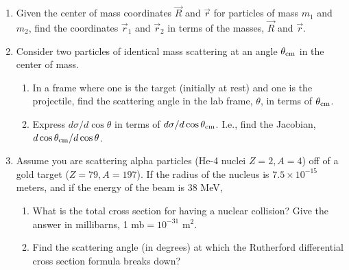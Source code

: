\begin{enumerate}
\item Given the center of mass coordinates $\vec{R}$ and $\vec{r}$ for particles of mass $m_1$ and $m_2$, find the coordinates $\vec{r}_1$ and $\vec{r}_2$ in terms of the masses, $\vec{R}$ and $\vec{r}$.

\item Consider two particles of identical mass scattering at an angle $\theta_{\rm cm}$ in the center of mass.
\begin{enumerate}
\item In a frame where one is the target (initially at rest) and one is the projectile, find the scattering angle in the lab frame, $\theta$, in terms of $\theta_{\rm cm}$.
\item Express $d\sigma/d\cos\theta$ in terms of $d\sigma/d\cos\theta_{\rm cm}$. I.e., find the Jacobian, $d\cos\theta_{\rm cm}/d\cos\theta$.
\end{enumerate}

\item Assume you are scattering alpha particles (He-4 nuclei $Z=2, A=4$) off of a gold target ($Z=79, A=197$). If the radius of the nucleus is $7.5\times 10^{-15}$ meters, and if the energy of the beam is 38 MeV,
\begin{enumerate}
\item What is the total cross section for having a nuclear collision? Give the answer in millibarns, 1 mb$=10^{-31}$ m$^2$.
\item Find the scattering angle (in degrees) at which the Rutherford differential cross section formula breaks down?

\end{enumerate}
\end{enumerate}
%
